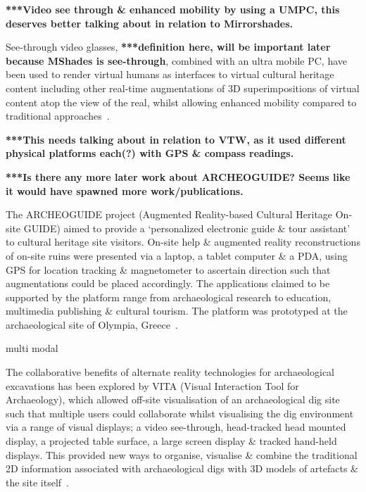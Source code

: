 
\textbf{***Video see through \& enhanced mobility by using a UMPC, this deserves better talking about in relation to Mirrorshades.}

See-through video glasses, \textbf{***definition here, will be important later because MShades is see-through}, combined with an ultra mobile PC, have been used to render virtual humans as interfaces to virtual cultural heritage content including other real-time augmentations of 3D superimpositions of virtual content atop the view of the real, whilst allowing enhanced mobility compared to traditional approaches~\cite{Magnenat-Thalmann2008a}.


\textbf{***This needs talking about in relation to VTW, as it used different physical platforms each(?) with GPS \& compass readings.}

\textbf{***Is there any more later work about ARCHEOGUIDE? Seems like it would have spawned more work/publications.}

The ARCHEOGUIDE project (Augmented Reality-based Cultural Heritage On-site GUIDE) aimed to provide a `personalized electronic guide \& tour assistant' to cultural heritage site visitors. On-site help \& augmented reality reconstructions of on-site ruins were presented via a laptop, a tablet computer \& a PDA, using GPS for location tracking \& magnetometer to ascertain direction such that augmentations could be placed accordingly. The applications claimed to be supported by the platform range from archaeological research to education, multimedia publishing \& cultural tourism. The platform was prototyped at the archaeological site of Olympia, Greece~\cite{vlahakis:archeoguide}.


multi modal

The collaborative benefits of alternate reality technologies for archaeological excavations has been explored by VITA (Visual Interaction Tool for Archaeology), which allowed off-site visualisation of an archaeological dig site such that multiple users could collaborate whilst visualising the dig environment via a range of visual displays; a video see-through, head-tracked head mounted display, a projected table surface, a large screen display \& tracked hand-held displays. This provided new ways to organise, visualise \& combine the traditional 2D information associated with archaeological digs with 3D models of artefacts \& the site itself~\cite{benko:collaborative}.

